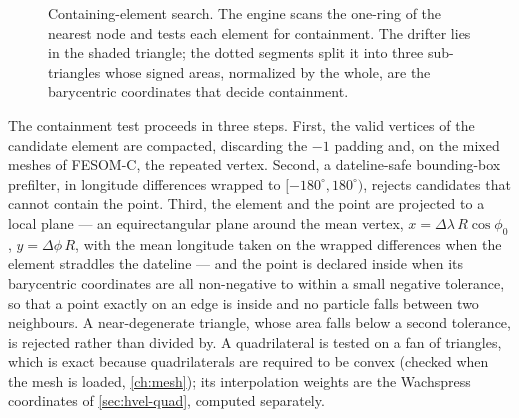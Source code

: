 \begin{figure}[t]
\centering
{}
\caption{Containing-element search. The engine scans the one-ring of the nearest node and tests each
element for containment. The drifter lies in the shaded triangle; the dotted segments split it into
three sub-triangles whose signed areas, normalized by the whole, are the barycentric coordinates that
decide containment.}
\label{fig:contain}
\end{figure}

The containment test proceeds in three steps. First, the valid vertices of the candidate element are
compacted, discarding the $-1$ padding and, on the mixed meshes of FESOM-C, the repeated vertex.
Second, a dateline-safe bounding-box prefilter, in longitude differences wrapped to
$[-180^{\circ},180^{\circ})$, rejects candidates that cannot contain the point. Third, the element and
the point are projected to a local plane --- an equirectangular plane around the mean vertex,
$x=\Delta\lambda\,R\cos\phi_0$, $y=\Delta\phi\,R$, with the mean longitude taken on the wrapped
differences when the element straddles the dateline --- and the point is declared inside when its
barycentric coordinates are all non-negative to within a small negative tolerance, so that a point
exactly on an edge is inside and no particle falls between two neighbours. A near-degenerate triangle,
whose area falls below a second tolerance, is rejected rather than divided by. A quadrilateral is
tested on a fan of triangles, which is exact because quadrilaterals are required to be convex
(checked when the mesh is loaded, \cref{ch:mesh}); its interpolation weights are the Wachspress
coordinates of \cref{sec:hvel-quad}, computed separately.

